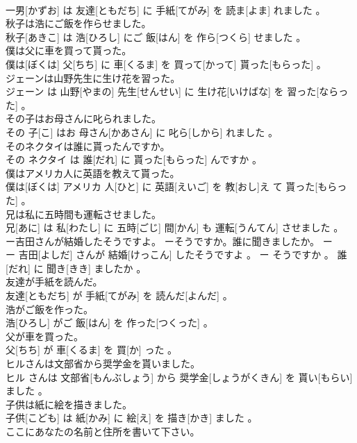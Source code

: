\documentclass[8pt]{extreport}
\begin{document}
\begin{CJK}{UTF8}{min}
\\	一男[かずお] は 友達[ともだち] に 手紙[てがみ] を 読ま[よま] れました 。
\\	秋子は浩にご飯を作らせました。	
\\	秋子[あきこ] は 浩[ひろし] にご 飯[はん] を 作ら[つくら] せました 。
\\	僕は父に車を買って貰った。	
\\	僕は[ぼくは] 父[ちち] に 車[くるま] を 買って[かって] 貰った[もらった] 。
\\	ジェーンは山野先生に生け花を習った。	
\\	ジェーン は 山野[やまの] 先生[せんせい] に 生け花[いけばな] を 習った[ならった] 。
\\	その子はお母さんに叱られました。	
\\	その 子[こ] はお 母さん[かあさん] に 叱ら[しから] れました 。
\\	そのネクタイは誰に貰ったんですか。	
\\	その ネクタイ は 誰[だれ] に 貰った[もらった] んですか 。
\\	僕はアメリカ人に英語を教えて貰った。	
\\	僕は[ぼくは] アメリカ 人[ひと] に 英語[えいご] を 教[おし]え て 貰った[もらった] 。
\\	兄は私に五時間も運転させました。	
\\	兄[あに] は 私[わたし] に 五時[ごじ] 間[かん] も 運転[うんてん] させました 。
\\	ー吉田さんが結婚したそうですよ。 ーそうですか。誰に聞きましたか。	ー
\\	ー 吉田[よしだ] さんが 結婚[けっこん] したそうですよ 。 ー そうですか 。 誰[だれ] に 聞き[きき] ましたか 。
\\	友達が手紙を読んだ。	
\\	友達[ともだち] が 手紙[てがみ] を 読んだ[よんだ] 。
\\	浩がご飯を作った。	
\\	浩[ひろし] がご 飯[はん] を 作った[つくった] 。
\\	父が車を買った。	
\\	父[ちち] が 車[くるま] を 買[か] った 。
\\	ヒルさんは文部省から奨学金を貰いました。	
\\	ヒル さんは 文部省[もんぶしょう] から 奨学金[しょうがくきん] を 貰い[もらい] ました 。
\\	子供は紙に絵を描きました。	
\\	子供[こども] は 紙[かみ] に 絵[え] を 描き[かき] ました 。
\\	ここにあなたの名前と住所を書いて下さい。	

\end{CJK}
\end{document}
